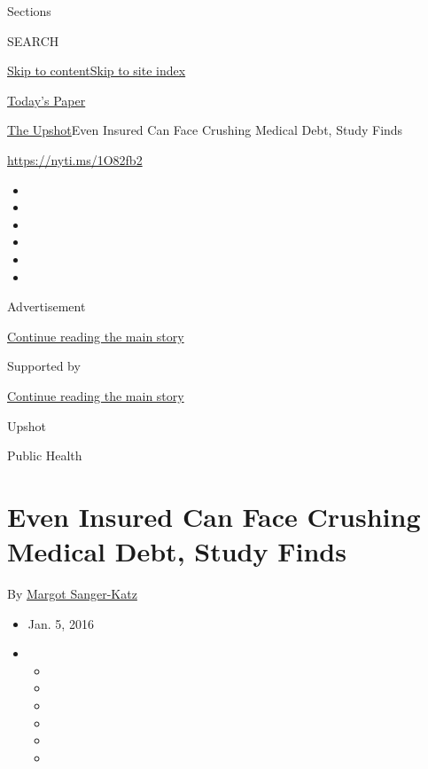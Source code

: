 Sections

SEARCH

\protect\hyperlink{site-content}{Skip to
content}\protect\hyperlink{site-index}{Skip to site index}

\href{https://myaccount.nytimes.com/auth/login?response_type=cookie\&client_id=vi}{}

\href{https://www.nytimes.com/section/todayspaper}{Today's Paper}

\href{/section/upshot}{The Upshot}\textbar{}Even Insured Can Face
Crushing Medical Debt, Study Finds

\url{https://nyti.ms/1O82fb2}

\begin{itemize}
\item
\item
\item
\item
\item
\item
\end{itemize}

Advertisement

\protect\hyperlink{after-top}{Continue reading the main story}

Supported by

\protect\hyperlink{after-sponsor}{Continue reading the main story}

Upshot

Public Health

\hypertarget{even-insured-can-face-crushing-medical-debt-study-finds}{%
\section{Even Insured Can Face Crushing Medical Debt, Study
Finds}\label{even-insured-can-face-crushing-medical-debt-study-finds}}

By \href{http://www.nytimes.com/by/margot-sanger-katz}{Margot
Sanger-Katz}

\begin{itemize}
\item
  Jan. 5, 2016
\item
  \begin{itemize}
  \item
  \item
  \item
  \item
  \item
  \item
  \end{itemize}
\end{itemize}

